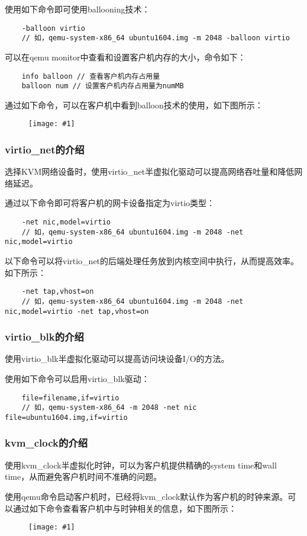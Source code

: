 \documentclass[a4paper,left=2.5cm,right=2.5cm,11pt]{article}
\newcommand{\fic}[1]{\begin{figure}[H]
		\center
		\texttt{[image: \#1]}
	\end{figure}}
\begin{document}
	使用如下命令即可使用ballooning技术：
	\begin{lstlisting}
	-balloon virtio
	// 如，qemu-system-x86_64 ubuntu1604.img -m 2048 -balloon virtio
	\end{lstlisting}

	可以在qemu monitor中查看和设置客户机内存的大小，命令如下：
	\begin{lstlisting}
	info balloon // 查看客户机内存占用量
	balloon num // 设置客户机内存占用量为numMB
	\end{lstlisting}

	通过如下命令，可以在客户机中看到balloon技术的使用，如下图所示：
	\fic{2.png}

\subsubsection{virtio\_net的介绍}
	选择KVM网络设备时，使用virtio\_net半虚拟化驱动可以提高网络吞吐量和降低网络延迟。\par
	通过以下命令即可将客户机的网卡设备指定为virtio类型：
	\begin{lstlisting}
	-net nic,model=virtio
	// 如，qemu-system-x86_64 ubuntu1604.img -m 2048 -net nic,model=virtio
	\end{lstlisting}

	以下命令可以将virtio\_net的后端处理任务放到内核空间中执行，从而提高效率。如下所示：
	\begin{lstlisting}
	-net tap,vhost=on
	// 如，qemu-system-x86_64 ubuntu1604.img -m 2048 -net nic,model=virtio -net tap,vhost=on
	\end{lstlisting}

\subsubsection{virtio\_blk的介绍}
	使用virtio\_blk半虚拟化驱动可以提高访问块设备I/O的方法。\par
	使用如下命令可以启用virtio\_blk驱动：
	\begin{lstlisting}
	file=filename,if=virtio
	// 如，qemu-system-x86_64 -m 2048 -net nic file=ubuntu1604.img,if=virtio
	\end{lstlisting}

\subsubsection{kvm\_clock的介绍}
	使用kvm\_clock半虚拟化时钟，可以为客户机提供精确的system time和wall time，从而避免客户机时间不准确的问题。\par
	使用qemu命令启动客户机时，已经将kvm\_clock默认作为客户机的时钟来源。可以通过如下命令查看客户机中与时钟相关的信息，如下图所示：
	\fic{1.png}
\end{document}
